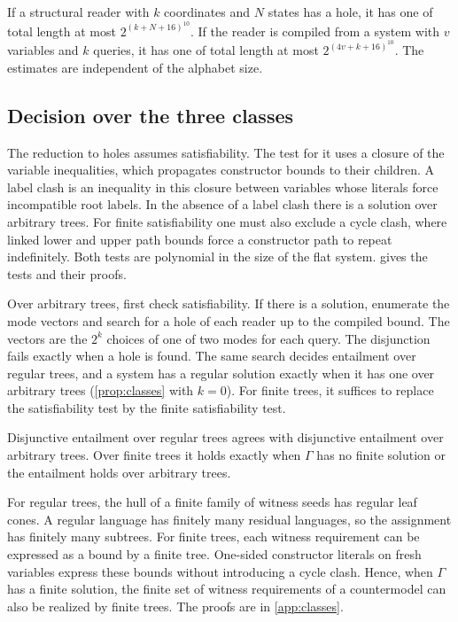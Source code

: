 \begin{theorem}\label{thm:short}
If a structural reader with $k$ coordinates and $N$ states has a hole,
it has one of total length at most $2^{(k+N+16)^{10}}$. If the reader
is compiled from a system with $v$ variables and $k$ queries, it has
one of total length at most $2^{(4v+k+16)^{10}}$. The estimates are
independent of the alphabet size.
\end{theorem}

\subsection{Decision over the three classes}

The reduction to holes assumes satisfiability. The test for it uses
a closure of the variable inequalities, which propagates constructor
bounds to their children. A label clash is an inequality in this
closure between variables whose literals force incompatible root
labels. In the absence of a label clash there is a solution over
arbitrary trees. For finite satisfiability one must also exclude a
cycle clash, where linked lower and upper path bounds force a
constructor path to repeat indefinitely. Both tests are polynomial
in the size of the flat system.  gives the tests
and their proofs.

Over arbitrary trees, first check satisfiability. If there is a
solution, enumerate the mode vectors and search for a hole of each
reader up to the compiled bound. The vectors are the $2^k$ choices of
one of two modes for each query. The disjunction fails exactly when
a hole is found. The same search decides entailment over regular
trees, and a system has a regular solution exactly when it has one
over arbitrary trees (\cref{prop:classes} with $k=0$). For finite trees, it suffices to replace the satisfiability
test by the finite satisfiability test.

\begin{proposition}\label{prop:classes}
Disjunctive entailment over regular trees agrees with disjunctive
entailment over arbitrary trees. Over finite trees it holds exactly
when $\Gamma$ has no finite solution or the entailment holds over
arbitrary trees.
\end{proposition}

For regular trees, the hull of a finite family of witness seeds has
regular leaf cones. A regular language has finitely many residual
languages, so the assignment has finitely many subtrees.
For finite trees, each witness requirement can be expressed as a
bound by a finite tree. One-sided constructor literals on fresh
variables express these bounds without introducing a cycle clash.
Hence, when $\Gamma$ has a finite solution, the finite set of
witness requirements of a countermodel can also be realized by
finite trees. The proofs are in \cref{app:classes}.

